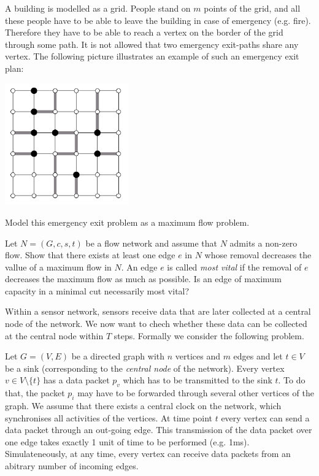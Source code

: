 
\question A building is modelled as a grid.
People stand on $m$ points of the grid,
and all these people have to be able to leave the building in case of emergency (e.g. fire).
Therefore they have to be able to reach a vertex on the border of the grid through some path.
It is not allowed that two emergency exit-paths share any vertex.
The following picture illustrates an example of such an emergency exit plan:
\begin{center}
    \includegraphics[width=0.4\textwidth]{images/pc-02-1.png}
\end{center}
Model this emergency exit problem as a maximum flow problem.

\question Let $N=(G,c,s,t)$ be a flow network and assume that $N$ admits a non-zero flow.
Show that there exists at least one edge $e$ in $N$ whose removal decreases the vallue of a
maximum flow in $N$.
An edge $e$ is called \emph{most vital} if the removal of $e$ decreases the maximum flow as much as possible.
Is an edge of maximum capacity in a minimal cut necessarily most vital?

\question 
Within a sensor network, sensors receive data that are later collected at a central node of the network.
We now want to chech whether these data can be collected at the central node within $T$ steps.
Formally we consider the following problem.

Let $G = (V,E)$ be a directed graph with $n$ vertices and $m$ edges and let $t \in V$ be a sink 
(corresponding to the \emph{central node} of the network).
Every vertex $v \in V \setminus \{t\}$ has a data packet $p_v$ which has to be transmitted to the sink $t$.
To do that, the packet $p_i$ may have to be forwarded through several other vertices of the graph.
We assume that there exists a central clock on the network, which synchronises all activities of the vertices.
At time point $t$ every vertex can send a data packet through an out-going edge.
This transmission of the data packet over one edge takes exactly 1 unit of time to be performed (e.g. 1ms).
Simulateneously, at any time, every vertex can receive data packets from an abitrary number of incoming edges.


